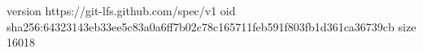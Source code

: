 version https://git-lfs.github.com/spec/v1
oid sha256:64323143eb33ee5c83a0a6ff7b02c78c165711feb591f803fb1d361ca36739cb
size 16018

